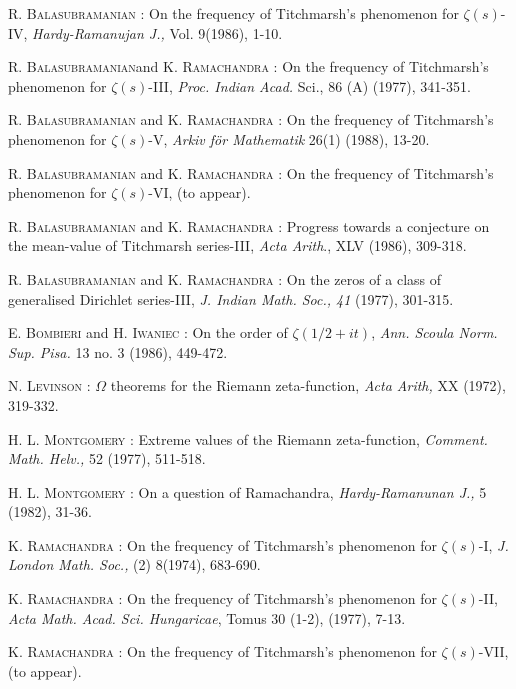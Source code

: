 \begin{thebibliography}{99}
 \textsc{R. Balasubramanian} : On the frequency of Titchmarsh's phenomenon for $\zeta(s)$-IV, \textit{Hardy-Ramanujan J.,} Vol. 9(1986), 1-10.

 \textsc{R. Balasubramanian}\pageoriginale and \textsc{K. Ramachandra} : On the frequency of Titchmarsh's phenomenon for $\zeta(s)$-III, \textit{Proc. Indian Acad.} Sci., 86 (A) (1977), 341-351.

 \textsc{R. Balasubramanian} and \textsc{K. Ramachandra} : On the frequency of Titchmarsh's phenomenon for $\zeta(s)$-V, \textit{Arkiv f\"or Mathematik} 26(1) (1988), 13-20.

 \textsc{R. Balasubramanian} and \textsc{K. Ramachandra} : On the frequency of Titchmarsh's phenomenon for $\zeta(s)$-VI, (to appear).

 \textsc{R. Balasubramanian} and \textsc{K. Ramachandra} : Progress towards a conjecture on the mean-value of Titchmarsh series-III, \textit{Acta Arith}., XLV (1986), 309-318.

 \textsc{R. Balasubramanian} and \textsc{K. Ramachandra} : On the zeros of a class of generalised Dirichlet series-III, \textit{J. Indian Math. Soc., 41} (1977), 301-315.

 \textsc{E. Bombieri} and \textsc{H. Iwaniec} : On the order of $\zeta(1/2+it)$, \textit{Ann. Scoula Norm. Sup. Pisa.} 13 no. 3 (1986), 449-472.

 \textsc{N. Levinson} : $\Omega$ theorems for the Riemann zeta-function, \textit{Acta Arith,} XX (1972), 319-332.

 \textsc{H. L. Montgomery} : Extreme values of the Riemann zeta-function, \textit{Comment. Math. Helv.,} 52 (1977), 511-518.

 \textsc{H. L. Montgomery} : On a question of Ramachandra, \textit{Hardy-Ramanunan J.,} 5 (1982), 31-36.

 \textsc{K. Ramachandra} : On the frequency of Titchmarsh's phenomenon for $\zeta(s)$-I, \textit{J. London Math. Soc.,} (2) 8(1974), 683-690.

 \textsc{K. Ramachandra} : On the frequency of Titchmarsh's phenomenon for $\zeta(s)$-II, \textit{Acta Math. Acad. Sci. Hungaricae}, Tomus 30 (1-2), (1977), 7-13.

  \textsc{K. Ramachandra} : On the frequency of Titchmarsh's phenomenon for $\zeta(s)$-VII, (to appear).


\end{thebibliography}
